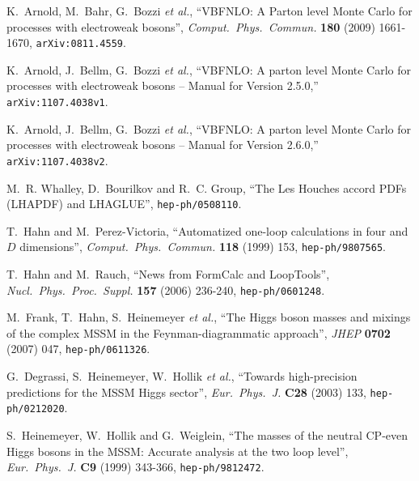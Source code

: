 \documentclass[english,12pt]{article}
\begin{document}
\providecommand{\href}[2]{#2}\begingroup\begin{thebibliography}{10}

  K.~Arnold, M.~Bahr, G.~Bozzi {\it et al.},
  ``VBFNLO: A Parton level Monte Carlo for processes with electroweak bosons'',
  {\em Comput.\ Phys.\ Commun.}  {\bf 180 } (2009)  1661-1670, \href{https://arxiv.org/abs/0811.4559}{{\tt arXiv:0811.4559}}.

  K.~Arnold, J.~Bellm, G.~Bozzi {\it et al.},
  ``VBFNLO: A parton level Monte Carlo for processes with electroweak bosons -- Manual for Version 2.5.0,''
  \href{https://arxiv.org/abs/1107.4038v1}{{\tt arXiv:1107.4038v1}}.
  
  K.~Arnold, J.~Bellm, G.~Bozzi {\it et al.},
  ``VBFNLO: A parton level Monte Carlo for processes with electroweak bosons -- Manual for Version 2.6.0,''
  \href{https://arxiv.org/abs/1107.4038v2}{{\tt arXiv:1107.4038v2}}.
  
M.~R. Whalley, D.~Bourilkov and R.~C. Group, ``The Les Houches accord PDFs
(LHAPDF) and LHAGLUE'',
\href{https://www.arXiv.org/abs/hep-ph/0508110}{{\tt hep-ph/0508110}}.

  T.~Hahn and M.~Perez-Victoria,
  ``Automatized one-loop calculations in four and $D$ dimensions'',
  {\em Comput.\ Phys.\ Commun.}  {\bf 118} (1999) 153,
\href{https://www.arXiv.org/abs/hep-ph/9807565}{{\tt hep-ph/9807565}}.

  T.~Hahn and M.~Rauch,
  ``News from FormCalc and LoopTools'',
  {\em Nucl.\ Phys.\ Proc.\ Suppl.}  {\bf 157} (2006)  236-240,
\href{https://www.arXiv.org/abs/hep-ph/0601248}{{\tt hep-ph/0601248}}.

  M.~Frank, T.~Hahn, S.~Heinemeyer {\it et al.},
  ``The Higgs boson masses and mixings of the complex MSSM in the
  Feynman-diagrammatic approach'',
  {\em JHEP} {\bf 0702} (2007) 047,
\href{https://www.arXiv.org/abs/hep-ph/0611326}{{\tt hep-ph/0611326}}.

  G.~Degrassi, S.~Heinemeyer, W.~Hollik {\it et al.},
  ``Towards high-precision predictions for the MSSM Higgs sector'',
  {\em Eur.\ Phys.\ J.} {\bf C28} (2003) 133,
\href{https://www.arXiv.org/abs/hep-ph/0212020}{{\tt hep-ph/0212020}}.

  S.~Heinemeyer, W.~Hollik and G.~Weiglein,
  ``The masses of the neutral CP-even Higgs bosons in the MSSM: Accurate analysis at the two loop level'',
  {\em Eur.\ Phys.\ J.} {\bf C9} (1999)  343-366,
\href{https://www.arXiv.org/abs/hep-ph/9812472}{{\tt hep-ph/9812472}}.


\end{thebibliography}
\end{document}
